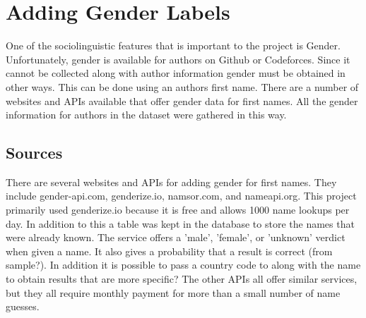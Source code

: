 \documentclass{article}
\begin{document}
\section{Adding Gender Labels}
One of the sociolinguistic features that is important to the project is Gender. Unfortunately, gender is available for authors on Github or Codeforces. Since it cannot be collected along with author information gender must be obtained in other ways. This can be done using an authors first name. There are a number of websites and APIs available that offer gender data for first names. All the gender information for authors in the dataset were gathered in this way.

\subsection{Sources}
There are several websites and APIs for adding gender for first names. They include gender-api.com, genderize.io, namsor.com, and nameapi.org. This project primarily used genderize.io because it is free and allows 1000 name lookups per day. In addition to this a table was kept in the database to store the names that were already known. The service offers a 'male', 'female', or 'unknown' verdict when given a name. It also gives a probability that a result is correct (from sample?). In addition it is possible to pass a country code to along with the name to obtain results that are more specific? The other APIs all offer similar services, but they all require monthly payment for more than a small number of name guesses.

\end{document}
